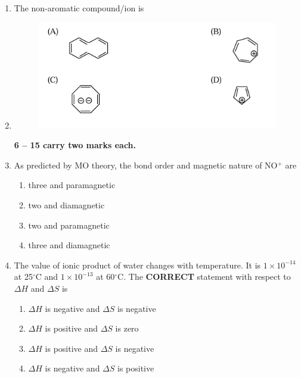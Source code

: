 \documentclass[journal,12pt,onecolumn]{IEEEtran}
\begin{document}
\begin{enumerate}[label=\arabic*.]
\item The non-aromatic compound/ion is

\item \begin{figure}[H]
    \centering
    \includegraphics[width=0.7\columnwidth]{FIG/H-5.png}
    \caption*{}
    \label{fig:H-5}
\end{figure}

\noindent \textbf{6 -- 15 carry two marks each.}

\item As predicted by MO theory, the bond order and magnetic nature of NO$^+$ are
\begin{multicols}{2}
\begin{enumerate}[label=(\Alph*)]
\item three and paramagnetic
\item two and diamagnetic
\item two and paramagnetic
\item three and diamagnetic
\end{enumerate}
\end{multicols}

\item The value of ionic product of water changes with temperature. It is $1 \times 10^{-14}$ at 25$^\circ$C and $1 \times 10^{-13}$ at 60$^\circ$C. The \textbf{CORRECT} statement with respect to $\Delta H$ and $\Delta S$ is
\begin{multicols}{2}
\begin{enumerate}[label=(\Alph*)]
\item $\Delta H$ is negative and $\Delta S$ is negative
\item $\Delta H$ is positive and $\Delta S$ is zero
\item $\Delta H$ is positive and $\Delta S$ is negative
\item $\Delta H$ is negative and $\Delta S$ is positive
\end{enumerate}
\end{multicols}


\end{enumerate}
\end{document}
